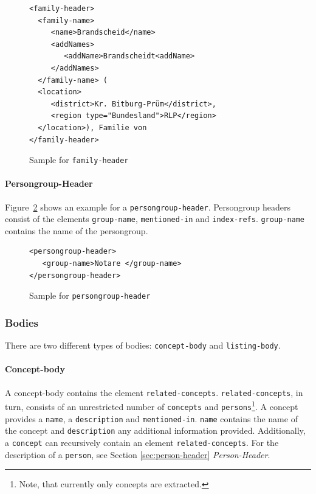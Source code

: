\begin{figure}[H]
\centering
\begin{verbatim}
<family-header>
  <family-name>
     <name>Brandscheid</name>
     <addNames>
        <addName>Brandscheidt<addName>
     </addNames>
  </family-name> (
  <location>
     <district>Kr. Bitburg-Prüm</district>,
     <region type="Bundesland">RLP</region>
  </location>), Familie von
</family-header>
\end{verbatim}
\caption{Sample for \texttt{family-header}}
\label{fig:family-header-xml}
\end{figure}

\paragraph{Persongroup-Header}
Figure~\ref{fig:persongroup-header-xml} shows an example for a
\texttt{persongroup-header}. Persongroup headers consist of the
elements \texttt{group-name}, \texttt{mentioned-in} and
\texttt{index-refs}. \texttt{group-name} contains the name of the
persongroup.

\begin{figure}[H]
\centering
\begin{verbatim}
<persongroup-header>
   <group-name>Notare </group-name>
</persongroup-header>
\end{verbatim}
\caption{Sample for \texttt{persongroup-header}}
\label{fig:persongroup-header-xml}
\end{figure}

\subsubsection{Bodies}
There are two different types of bodies: \texttt{concept-body} and
\texttt{listing-body}.

\paragraph{Concept-body}
A concept-body contains the element \texttt{related-concepts}.
\texttt{related-concepts}, in turn, consists of an unrestricted number
of \texttt{concepts} and \texttt{persons}\footnote{Note, that
  currently only concepts are extracted.}. A concept provides a
\texttt{name}, a \texttt{description} and \texttt{mentioned-in}.
\texttt{name} contains the name of the concept and
\texttt{description} any additional information provided.
Additionally, a \texttt{concept} can recursively contain an element
\texttt{related-concepts}. For the description of a \texttt{person},
see Section \ref{sec:person-header} \textit{Person-Header}.

